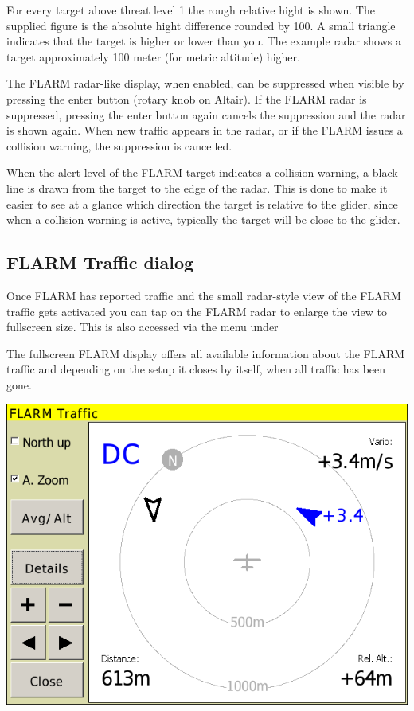 \documentclass[a4paper,12pt]{refrep}
\begin{document}
For every target above threat level 1 the rough relative hight is shown. The
supplied figure is the absolute hight difference rounded by 100.  A small
triangle indicates that the target is higher or lower than you. The example
radar shows a target approximately 100 meter (for metric altitude) higher.

The FLARM radar-like display, when enabled, can be suppressed when
visible by pressing the enter button (rotary knob on Altair).  If the
FLARM radar is suppressed, pressing the enter button again cancels the
suppression and the radar is shown again.  When new traffic appears in
the radar, or if the FLARM issues a collision warning, the suppression
is cancelled.

When the alert level of the FLARM target indicates a collision
warning, a black line is drawn from the target to the edge of the
radar.  This is done to make it easier to see at a glance which
direction the target is relative to the glider, since when a collision
warning is active, typically the target will be close to the glider.

\subsection*{FLARM Traffic dialog}
Once FLARM has reported traffic and the small radar-style view of the FLARM
traffic gets activated   you can tap on the FLARM radar to
enlarge the view to fullscreen size.  This is also accessed via the menu under
\begin{quote}
\blink{}\blink{}\blink{}
\end{quote}
The fullscreen FLARM display offers all available information
about the FLARM traffic and depending on the setup it closes by itself, when all
traffic has been gone.

\begin{center}
\includegraphics[angle=0,width=0.8\linewidth,keepaspectratio='true']{figures/dialog-flarm1.png}
\end{center}
\end{document}

